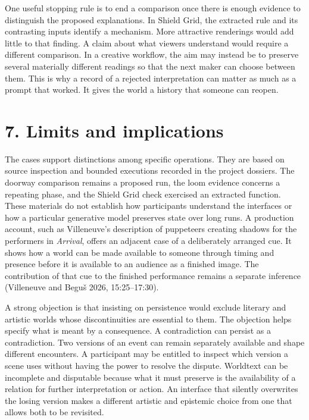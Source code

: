 \documentclass[
  11pt,
  letterpaper,
]{article}
\begin{document}
One useful stopping rule is to end a comparison once there is enough
evidence to distinguish the proposed explanations. In Shield Grid, the
extracted rule and its contrasting inputs identify a mechanism. More
attractive renderings would add little to that finding. A claim about
what viewers understand would require a different comparison. In a
creative workflow, the aim may instead be to preserve several materially
different readings so that the next maker can choose between them. This
is why a record of a rejected interpretation can matter as much as a
prompt that worked. It gives the world a history that someone can
reopen.

\hypertarget{limits-and-implications}{%
\section{7. Limits and implications}\label{limits-and-implications}}

The cases support distinctions among specific operations. They are based
on source inspection and bounded executions recorded in the project
dossiers. The doorway comparison remains a proposed run, the loom
evidence concerns a repeating phase, and the Shield Grid check exercised
an extracted function. These materials do not establish how participants
understand the interfaces or how a particular generative model preserves
state over long runs. A production account, such as Villeneuve's
description of puppeteers creating shadows for the performers in
\emph{Arrival}, offers an adjacent case of a deliberately arranged cue.
It shows how a world can be made available to someone through timing and
presence before it is available to an audience as a finished image. The
contribution of that cue to the finished performance remains a separate
inference (Villeneuve and Beguš 2026, 15:25--17:30).

A strong objection is that insisting on persistence would exclude
literary and artistic worlds whose discontinuities are essential to
them. The objection helps specify what is meant by a consequence. A
contradiction can persist as a contradiction. Two versions of an event
can remain separately available and shape different encounters. A
participant may be entitled to inspect which version a scene uses
without having the power to resolve the dispute. Worldtext can be
incomplete and disputable because what it must preserve is the
availability of a relation for further interpretation or action. An
interface that silently overwrites the losing version makes a different
artistic and epistemic choice from one that allows both to be revisited.
\end{document}

